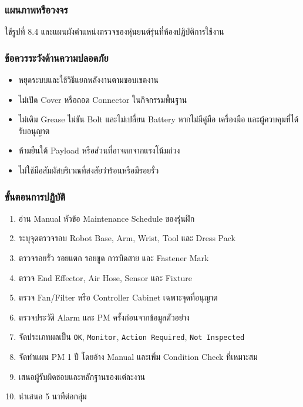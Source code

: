 \subsubsection{แผนภาพหรือวงจร}

ใช้รูปที่ 8.4 และแผนผังตำแหน่งตรวจของหุ่นยนต์รุ่นที่ห้องปฏิบัติการใช้งาน

\subsubsection{ข้อควรระวังด้านความปลอดภัย}

\begin{itemize}
    \item หยุดระบบและใช้วิธีแยกพลังงานตามขอบเขตงาน
    \item ไม่เปิด Cover หรือถอด Connector ในกิจกรรมพื้นฐาน
    \item ไม่เติม Grease ไม่ขัน Bolt และไม่เปลี่ยน Battery หากไม่มีคู่มือ เครื่องมือ และผู้ควบคุมที่ได้รับอนุญาต
    \item ห้ามยืนใต้ Payload หรือส่วนที่อาจตกจากแรงโน้มถ่วง
    \item ไม่ใช้มือสัมผัสบริเวณที่สงสัยว่าร้อนหรือมีรอยรั่ว
\end{itemize}

\subsubsection{ขั้นตอนการปฏิบัติ}

\begin{enumerate}
    \item อ่าน Manual หัวข้อ Maintenance Schedule ของรุ่นฝึก
    \item ระบุจุดตรวจรอบ Robot Base, Arm, Wrist, Tool และ Dress Pack
    \item ตรวจรอยรั่ว รอยแตก รอยขูด การบิดสาย และ Fastener Mark
    \item ตรวจ End Effector, Air Hose, Sensor และ Fixture
    \item ตรวจ Fan/Filter หรือ Controller Cabinet เฉพาะจุดที่อนุญาต
    \item ตรวจประวัติ Alarm และ PM ครั้งก่อนจากข้อมูลตัวอย่าง
    \item จัดประเภทผลเป็น \texttt{OK}, \texttt{Monitor}, \texttt{Action Required}, \texttt{Not Inspected}
    \item จัดทำแผน PM 1 ปี โดยอ้าง Manual และเพิ่ม Condition Check ที่เหมาะสม
    \item เสนอผู้รับผิดชอบและหลักฐานของแต่ละงาน
    \item นำเสนอ 5 นาทีต่อกลุ่ม
\end{enumerate}

